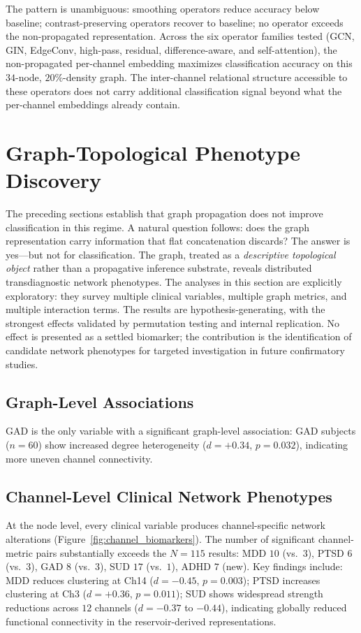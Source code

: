 The pattern is unambiguous: smoothing operators reduce accuracy below baseline; contrast-preserving operators recover to baseline; no operator exceeds the non-propagated representation. Across the six operator families tested (GCN, GIN, EdgeConv, high-pass, residual, difference-aware, and self-attention), the non-propagated per-channel embedding maximizes classification accuracy on this $34$-node, $20\%$-density graph. The inter-channel relational structure accessible to these operators does not carry additional classification signal beyond what the per-channel embeddings already contain.


\section{Graph-Topological Phenotype Discovery}
\label{sec:ch5_interpretability}

The preceding sections establish that graph propagation does not improve classification in this regime. A natural question follows: does the graph representation carry information that flat concatenation discards? The answer is yes---but not for classification. The graph, treated as a \emph{descriptive topological object} rather than a propagative inference substrate, reveals distributed transdiagnostic network phenotypes. The analyses in this section are explicitly exploratory: they survey multiple clinical variables, multiple graph metrics, and multiple interaction terms. The results are hypothesis-generating, with the strongest effects validated by permutation testing and internal replication. No effect is presented as a settled biomarker; the contribution is the identification of candidate network phenotypes for targeted investigation in future confirmatory studies.

\subsection{Graph-Level Associations}

GAD is the only variable with a significant graph-level association: GAD subjects ($n = 60$) show increased degree heterogeneity ($d = +0.34$, $p = 0.032$), indicating more uneven channel connectivity.

\subsection{Channel-Level Clinical Network Phenotypes}

At the node level, every clinical variable produces channel-specific network alterations (Figure~\ref{fig:channel_biomarkers}). The number of significant channel-metric pairs substantially exceeds the $N = 115$ results: MDD $10$ (vs.\ $3$), PTSD $6$ (vs.\ $3$), GAD $8$ (vs.\ $3$), SUD $17$ (vs.\ $1$), ADHD $7$ (new). Key findings include: MDD reduces clustering at Ch14 ($d = -0.45$, $p = 0.003$); PTSD increases clustering at Ch3 ($d = +0.36$, $p = 0.011$); SUD shows widespread strength reductions across $12$ channels ($d = -0.37$ to $-0.44$), indicating globally reduced functional connectivity in the reservoir-derived representations.

